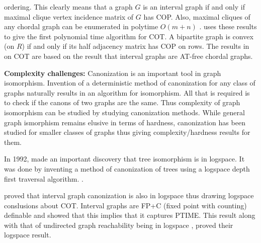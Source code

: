 \documentclass[MS,synopsis]{iitmdiss}
\begin{document}
ordering\cite{gh64}. This clearly means that a graph $G$ is an
interval graph if and only if  maximal clique vertex incidence matrix of $G$
has COP.  Also, maximal cliques of any chordal graph can be enumerated
in polytime $O(m+n)$ .  \cite{fg65} uses these
results to give the first polynomial time algorithm for
COT.   A bipartite graph
is convex (on $R$) if and only if its half adjacency matrix has COP on
rows.  The results in \cite{bl76}
on COT are based on the result that
interval graphs are AT-free chordal graphs. 








{\bf Complexity challenges:} Canonization is an important tool in graph isomorphism. Invention of a
deterministic method of canonization for any class of graphs naturally
results in an algorithm for isomorphism. All that is required is to
check if the canons of two graphs are the same. Thus complexity of
graph isomorphism can be studied by studying canonization
methods. While general graph ismorphism remains elusive in terms of
hardness, canonization has been studied for smaller classes of graphs
thus giving complexity/hardness results for them.

In 1992, \cite{sl92} made an important discovery that tree isomorphism
is in logspace. It was done by inventing a method of canonization of
trees using a logspace depth first traversal
algorithm. .

\cite{kklv10} proved that interval graph canonization is also in
logspace thus drawing logspace conslusions about COT. 
Interval graphs are FP+C (fixed point with
counting) definable  and \cite{l10} showed that
this implies that it captures PTIME.  This result
along with that of undirected graph reachability being in logspace
\cite{rei08}, \cite{kklv10} proved their logspace result.\\ 
\end{document}
